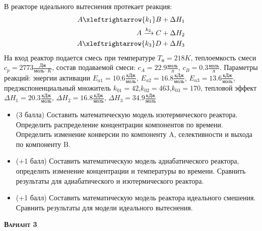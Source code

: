 В реакторе идеального вытеснения протекает реакция: \begin{equation*} \begin{aligned} A \xleftrightarrow{k_1} B + \Delta H_1 \\ A \xrightarrow{k_2} C + \Delta H_2 \\ A \xleftrightarrow{k_3} D + \Delta H_3 \end{aligned} \end{equation*} На вход  реактор подается смесь при температуре $ T_н =  218 K$, теплоемкость смеси $c_p= 2773 \frac{Дж}{моль \cdot K}$, состав подаваемой смеси: $c_A=22.9 \frac{моль}{л}$, $c_B=0.3 \frac{моль}{л}$. Параметры реакций: энергии активации $E_{a1}=10.6 \frac{кДж}{моль}$, $E_{a2}=16.8  \frac{кДж}{моль}$, $E_{a3}=13.6  \frac{кДж}{моль}$, предэкспоненциальный множитель $k_{01}=        42$,$k_{02}=       463$,$k_{03}=       170$, тепловой эффект $\Delta H_1= 20.3 \frac{кДж}{моль}$, $\Delta H_2=16.8 \frac{кДж}{моль}$, $\Delta H_3 = 34.9 \frac{кДж}{моль}$\begin{itemize} \item (3 балла) Составить математическую модель изотермического реактора. Определить распределение концентрации компонентов по времени. Определить изменение конверсии по компоненту A, селективности и выхода по компоненту B. \item (+1 балл) Составить математическую модель адиабатического реактора, определить изменение концентрации и температуры во времени. Сравнить результаты для адиабатического и изотермического реактора. \item (+1 балл) Составить математическую модель реактора идеального смешения. Сравнить результаты для модели идеального вытеснения. \end{itemize}

\textsc{\textbf{Вариант 3}}

